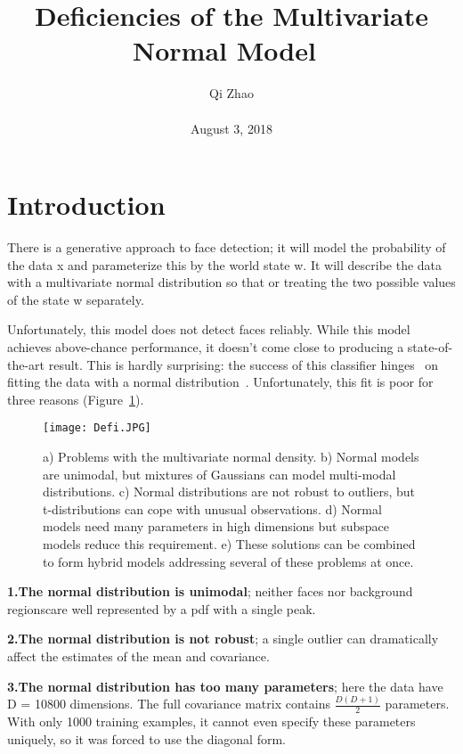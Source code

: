 \documentclass[10pt,twocolumn,letterpaper]{article}
\begin{document}
\title{Deficiencies of the Multivariate Normal Model~\cite{Skovgaard1984A}}
\author{Qi Zhao\\\\August 3, 2018}

\maketitle
\section{Introduction}
There is a generative approach to face detection; it will model the probability of the data x and parameterize this by the world state w. It will describe the data with a multivariate normal distribution so that or treating the two possible values of the state w separately.
\par Unfortunately, this model does not detect faces reliably. While this model achieves above-chance performance, it doesn't come close to producing a state-of-the-art result. This is hardly surprising: the success of this classifier hinges~\cite{Chen1989Oyster} on fitting the data with a normal distribution~\cite{Stein1981Estimation}. Unfortunately, this fit is poor for three reasons (Figure~\ref{fig:onecol}).
\begin{figure}[H]
\centering
\texttt{[image: Defi.JPG]}
 \caption{ a) Problems with the multivariate normal density. b) Normal models are unimodal, but mixtures of Gaussians can model multi-modal distributions. c) Normal distributions are not robust to outliers, but t-distributions can cope with unusual observations. d) Normal models need many parameters in high dimensions but subspace models reduce this requirement. e) These solutions can be combined to form hybrid models addressing several of these problems at once.}
\label{fig:onecol}
\end{figure}
\par \textbf{1.The normal distribution is unimodal}; neither faces nor background regionscare well represented by a pdf with a single peak.
\par \textbf{2.The normal distribution is not robust}; a single outlier can dramatically affect the estimates of the mean and covariance.
\par \textbf{3.The normal distribution has too many parameters}; here the data have D = 10800 dimensions. The full covariance matrix contains $\frac{D(D + 1)}{2}$ parameters. With only 1000 training examples, it cannot even specify these parameters uniquely, so it was forced to use the diagonal form.
\end{document}
